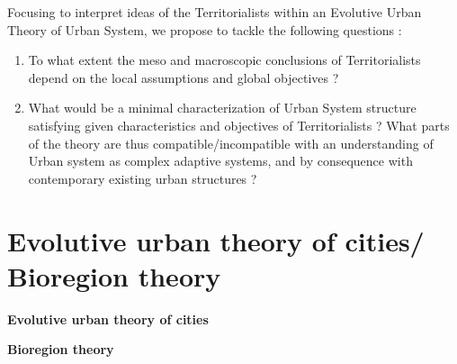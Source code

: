 \documentclass{article}
\begin{document}
% 



Focusing to interpret ideas of the Territorialists within an Evolutive Urban Theory of Urban System, we propose to tackle the following questions : 


\begin{enumerate}
\item To what extent the meso and macroscopic conclusions of Territorialists depend on the local assumptions and global objectives ?
\item What would be a minimal characterization of Urban System structure satisfying given characteristics and objectives of Territorialists ? What parts of the theory are thus compatible/incompatible with an understanding of Urban system as complex adaptive systems, and by consequence with contemporary existing urban structures ? 
\end{enumerate}





\section{Evolutive urban theory of cities/ Bioregion theory}

\textbf{Evolutive urban theory of cities}


\textbf{Bioregion theory}











\end{document}
